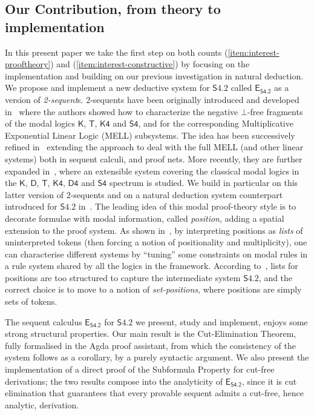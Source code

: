 \documentclass{article}
\newcommand{\logic}{\mathsf{S4.2}}
\newcommand{\axname}[1]{\mathsf{#1}}
\newcommand{\eseq}{\mathsf{E}_{{\textsf{S4.2}}}}
\newcommand{\agda}{\textsf{Agda}}
\theoremstyle{definition}
\begin{document}
\subsection{Our Contribution, from theory to implementation}
In this present paper we take the first step on both counts (\ref{item:interest-prooftheory}) and (\ref{item:interest-constructive}) by focusing on the implementation and building on our previous investigation in natural deduction. We propose and implement a new deductive system for $\logic$ called $\eseq$ as a version of \emph{2-sequent}s. 2-sequents have been originally introduced and developed in~\cite{Masini1992:TwoSequentModalities, Masini1993:TwoSequentIntuitionism,MM:ONFineStr:95,MM:ComInt:95} where the authors showed how to characterize the negative $\bot$-free fragments of the modal logics $\axname{K}$, $\axname{T}$, $\axname{K4}$ and $\axname{S4}$, and for the corresponding Multiplicative Exponential Linear Logic (MELL) subsystems. The idea has been successively refined in~\cite{GMM:an-exp-ext-seq,GueMarMasPNGC2001} extending the approach to deal with the full MELL (and other linear systems) both in sequent calculi, and proof nets. More recently, they are further expanded in~\cite{Martini2023:CutElimination}, where an extensible system covering the classical modal logics in the $\axname{K}$, $\axname{D}$, $\axname{T}$, $\axname{K4}$, $\axname{D4}$ and $\axname{S4}$ spectrum is studied. We build in particular on this latter version of 2-sequents and on a natural deduction system counterpart introduced for $\logic$ in~\cite{Martini2024:S42NaturalDeduction}.
The leading idea of this modal  proof-theory style is to decorate formulae with modal information, called \emph{position}, adding a spatial extension to the proof system.
As shown in~\cite{Martini2023:CutElimination}, by interpreting positions as \emph{lists} of uninterpreted tokens (then forcing a notion of positionality and multiplicity), one can characterise different systems by ``tuning'' some constraints on modal rules in a rule system shared by all the logics in the framework. According to~\cite{Martini2024:S42NaturalDeduction}, lists for positions are too structured to capture the intermediate system $\logic$, and the correct choice is to move to a notion of \emph{set-positions}, where positions are simply sets of tokens.

The sequent calculus $\eseq$ for $\logic$ we present, study and implement, enjoys some strong structural properties. Our main result is the Cut-Elimination Theorem, fully formalised in the \agda{} proof assistant, from which the consistency of the system follows as a corollary, by a purely syntactic argument. We also present the implementation of a direct proof of the Subformula Property for cut-free derivations; the two results compose into the analyticity of $\eseq$, since it is cut elimination that guarantees that every provable sequent admits a cut-free, hence analytic, derivation.%
\end{document}
